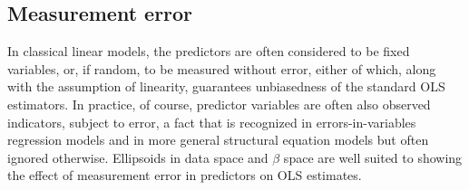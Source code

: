 \subsection{Measurement error}

In classical linear models, the predictors are often considered to be fixed
variables, or, if random, to be measured without error, either of which, along with the assumption of linearity, guarantees
unbiasedness of the standard OLS estimators.
In practice, of course, predictor variables are often also observed
indicators, subject to error, a fact that is recognized in errors-in-variables
regression models and in more general structural equation models
but often ignored otherwise.  Ellipsoids in data space and $\beta$ space
are well suited to showing the effect of measurement error in predictors on OLS estimates.

